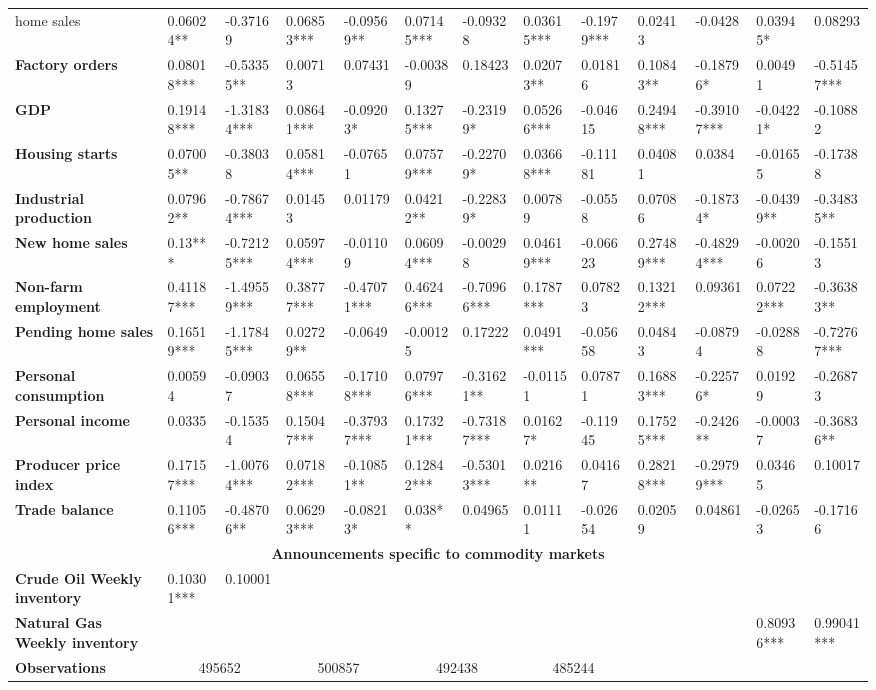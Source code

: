 \begin{sidewaystable}
{\begin{tabular}{@{}lllllllllllll@{}}
home sales}& 0.06024** & -0.37169 & 0.06853*** & -0.09569** & 0.07145*** & -0.09328 & 0.03615*** & -0.1979*** & 0.02413 & -0.0428 & 0.03945* & 0.08293 \\ \textbf{Factory orders}& 0.08018*** & -0.53355** & 0.00713 & 0.07431 & -0.00389 & 0.18423 & 0.02073** & 0.01816 & 0.10843** & -0.18796* & 0.00491 & -0.51457*** \\ \textbf{GDP}& 0.19148*** & -1.31834*** & 0.08641*** & -0.09203* & 0.13275*** & -0.23199* & 0.05266*** & -0.04615 & 0.24948*** & -0.39107*** & -0.04221* & -0.10882 \\ \textbf{Housing starts}& 0.07005** & -0.38038 & 0.05814*** & -0.07651 & 0.07579*** & -0.22709* & 0.03668*** & -0.11181 & 0.04081 & 0.0384 & -0.01655 & -0.17388 \\ \textbf{Industrial production}& 0.07962** & -0.78674*** & 0.01453 & 0.01179 & 0.04212** & -0.22839* & 0.00789 & -0.0558 & 0.07086 & -0.18734* & -0.04399** & -0.34835** \\ \textbf{New home sales}& 0.13*** & -0.72125*** & 0.05974*** & -0.01109 & 0.06094*** & -0.00298 & 0.04619*** & -0.06623 & 0.27489*** & -0.48294*** & -0.00206 & -0.15513 \\ \textbf{Non-farm employment}& 0.41187*** & -1.49559*** & 0.38777*** & -0.47071*** & 0.46246*** & -0.70966*** & 0.1787*** & 0.07823 & 0.13212*** & 0.09361 & 0.07222*** & -0.36383** \\ \textbf{Pending home sales}& 0.16519*** & -1.17845*** & 0.02729** & -0.0649 & -0.00125 & 0.17222 & 0.0491*** & -0.05658 & 0.04843 & -0.08794 & -0.02888 & -0.72767*** \\ \textbf{Personal consumption}& 0.00594 & -0.09037 & 0.06558*** & -0.17108*** & 0.07976*** & -0.31621** & -0.01151 & 0.07871 & 0.16883*** & -0.22576* & 0.01929 & -0.26873 \\ \textbf{Personal income}& 0.0335 & -0.15354 & 0.15047*** & -0.37937*** & 0.17321*** & -0.73187*** & 0.01627* & -0.11945 & 0.17525*** & -0.2426** & -0.00037 & -0.36836** \\ \textbf{Producer price index}& 0.17157*** & -1.00764*** & 0.07182*** & -0.10851** & 0.12842*** & -0.53013*** & 0.0216** & 0.04167 & 0.28218*** & -0.29799*** & 0.03465 & 0.10017 \\ \textbf{Trade balance}& 0.11056*** & -0.48706** & 0.06293*** & -0.08213* & 0.038** & 0.04965 & 0.01111 & -0.02654 & 0.02059 & 0.04861 & -0.02653 & -0.17166 \\  \midrule \multicolumn{13}{c}{\textbf{Announcements specific to commodity markets}} \\ \midrule \textbf{Crude Oil Weekly inventory}& 0.10301*** & 0.10001 &  &  &  &  &  &  &  &  &  &  \\ \textbf{Natural Gas Weekly inventory}&  &  &  &  &  &  &  &  &  &  & 0.80936*** & 0.99041*** \\  \midrule \textbf{Observations}             &\multicolumn{2}{c}{ 495652 }                                                 & \multicolumn{2}{c}{ 500857 }                                                 & \multicolumn{2}{c}{ 492438 }                                                 & \multicolumn{2}{c}{ 485244 }                                                 & 
\end{tabular}}
\end{sidewaystable}
